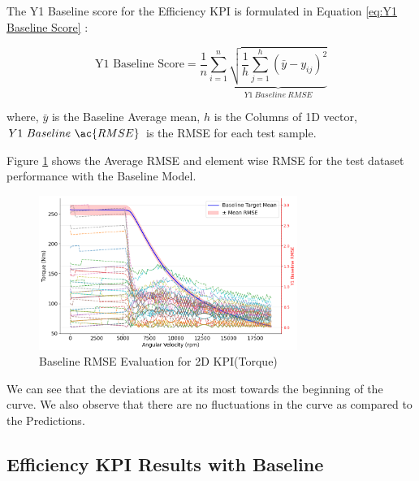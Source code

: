 \documentclass{report} %
\begin{document}
The Y1 Baseline score for the Efficiency \ac{KPI} is formulated in Equation \ref{eq:Y1 Baseline Score} :

\begin{equation}
    \text{Y1 Baseline Score} = \frac{1}{n} \sum_{i=1}^{n} \underbrace{ \sqrt{\frac{1}{h} \sum_{j=1}^{h} (\bar{y} - y_{ij})^2}}_{Y1\ Baseline\ RMSE}
    \label{eq:Y1 Baseline Score}
\end{equation}
    
where, \(\bar{y}\) is the Baseline Average mean, \(h\) is the Columns of 1D vector, \(Y1\ Baseline\ \ac{RMSE}\) is the \ac{RMSE} for each test sample.
    

\vspace{1em} %

Figure \ref{fig:Baseline RMSE Evaluation for 2D KPI(Torque)} shows the Average \ac{RMSE} and element wise \ac{RMSE} for the test dataset performance with the Baseline Model.\\

\begin{figure}[H]
    \centering
    \includegraphics[width=0.75\textwidth]{./ReportImages/RMSE_Baseline_y1.png} 
    \caption{Baseline \ac{RMSE} Evaluation for 2D KPI(Torque)} 
    \label{fig:Baseline RMSE Evaluation for 2D KPI(Torque)}
\end{figure}

We can see that the deviations are at its most towards the beginning of the curve. 
We also observe that there are no fluctuations in the curve as compared to the Predictions.\\

\subsection{Efficiency \ac{KPI} Results with Baseline}\label{sec:3D Efficiency Grid Results with Baseline}
\end{document}
